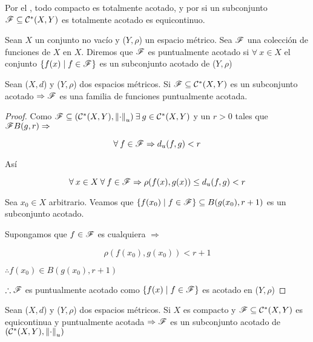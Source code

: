 \begin{orangeproof}
    Por el , todo compacto es totalmente acotado, y por  si un subconjunto  $\mathscr{F} \subseteq {\ensuremath{\mathcal{C}}}^{\ast}(X,Y)$ es totalmente acotado es equicontinuo.
\end{orangeproof}

\begin{definition} 
    Sean $X$ un conjunto no vacío y ($Y,\rho$) un espacio métrico. Sea $\mathscr{F}$ una colección de funciones de $X$ en $X$. Diremos que $\mathscr{F}$ es puntualmente acotado si $\forall \: x \in X$ el conjunto $\{ f(x) \mid f \in \mathscr{F} \}$ es un subconjunto acotado de ($Y,\rho$)
\end{definition}

\begin{lemma} \label{lemma521}
    Sean ($X,d$) y ($Y,\rho$) dos espacios métricos. Si $\mathscr{F} \subseteq {\ensuremath{\mathcal{C}}}^{\ast}(X,Y)$ es un subconjunto acotado $\Rightarrow \mathscr{F}$ es una familia de funciones puntualmente acotada.
\end{lemma}

\begin{proof}
    Como $\mathscr{F} \subseteq ({\mathcal{C}}^{\ast}(X,Y),{\norm{\cdot}}_{u}) \: \exists \: g \in {\ensuremath{\mathcal{C}}}^{\ast}(X,Y)$ y un $r > 0$ tales que $\mathscr{F} B(g,r) \Rightarrow$

    $$\forall \: f \in \mathscr{F} \Rightarrow d_u(f,g) < r$$

    Así

    $$\forall \: x \in X \: \forall \: f \in \mathscr{F} \Rightarrow \rho(f(x),g(x)) \leq d_u(f,g) < r$$

    Sea $x_0 \in X$ arbitrario. Veamos que $\{ f(x_0) \mid f \in \mathscr{F} \} \subseteq B(g(x_0), r+1)$ es un subconjunto acotado. 

    Supongamos que $f \in \mathscr{F}$ es cualquiera $\Rightarrow$

    $$\rho(f(x_0),g(x_0)) < r+ 1$$

    $\therefore f(x_0) \in B(g(x_0), r+1)$

    $\therefore \mathscr{F}$ es puntualmente acotado como $\{ f(x) \mid f \in \mathscr{F} \}$ es acotado en ($Y, \rho$)
\end{proof}

\begin{lemma} \label{lemma522}
     Sean ($X,d$) y ($Y,\rho$) dos espacios métricos. Si $X$ es compacto y $\mathscr{F} \subseteq {\ensuremath{\mathcal{C}}}^{\ast}(X,Y)$ es equicontinua y puntualmente acotada $\Rightarrow \mathscr{F}$ es un subconjunto acotado de $({\mathcal{C}}^{\ast}(X,Y),{\norm{\cdot}}_{u})$
\end{lemma}

